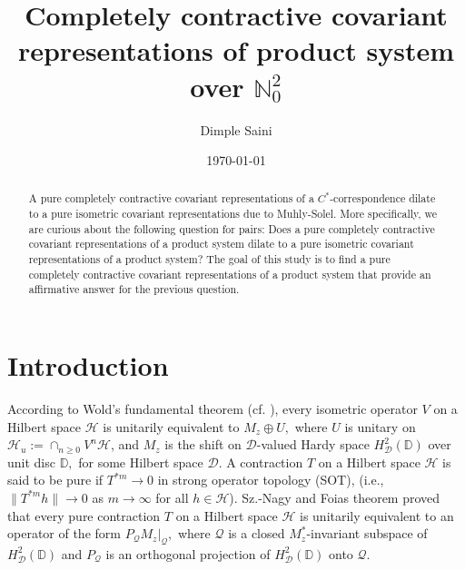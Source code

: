 \documentclass[12pt]{amsart}
\numberwithin{equation}{section}
\theoremstyle{plain}
\begin{document}
	
	\title[Completely contractive covariant representations]{Completely contractive covariant representations of product system over $\mathbb N^2_0$}
	
	
	\date{\today}
	\author[Saini]{Dimple Saini}
	\address{Department of Mathematics, Gautam Buddha University, Greater Noida, India}



	
		\begin{abstract}
		A pure completely contractive covariant representations of a $C^*$-correspondence dilate to a pure isometric covariant representations due to Muhly-Solel. More specifically, we are curious about the following question for pairs: Does a pure completely contractive covariant representations of a product system dilate to a pure isometric covariant representations of a product system? The goal of this study is to find a pure completely contractive covariant representations of a product system that provide an affirmative answer for the previous question.  
	\end{abstract}
	
	
	
	
	\maketitle

	
	\section{Introduction}
	According to Wold's fundamental theorem (cf. \cite{W1938}), every isometric operator $V$ on a Hilbert space $\mathcal{H}$ is unitarily equivalent to $M_z \oplus U,$ where $U$ is unitary on $\mathcal{H}_u:=\cap_{n\ge 0}V^n\mathcal{H}$, and $M_z$ is the shift on $\mathcal{D}$-valued Hardy space $H^2_{\mathcal{D}}(\mathbb{D})$ over unit disc $\mathbb{D},$ for some Hilbert space $\mathcal{D}.$ A contraction $T$ on a Hilbert space $\mathcal{H}$ is said to be pure if $T^{*m}\to 0$ in strong operator topology (SOT), (i.e., $\|T^{*m}h\| \rightarrow 0$ as $m \rightarrow \infty$ for all $h\in \mathcal{H}$). Sz.-Nagy and Foias theorem \cite{NFBK10} proved that every pure contraction $T$ on a Hilbert space $\mathcal{H}$ is unitarily equivalent to an operator of the form $P_{\mathcal{Q}}M_{z}|_{\mathcal{Q}},$ where $\mathcal{Q}$ is a closed $M_z^*$-invariant subspace of $H^2_{\mathcal{D}}(\mathbb{D})$ and $P_{\mathcal{Q}}$ is an orthogonal projection of $H^2_{\mathcal{D}}(\mathbb{D})$ onto $\mathcal{Q}.$ 
	
\end{document}
